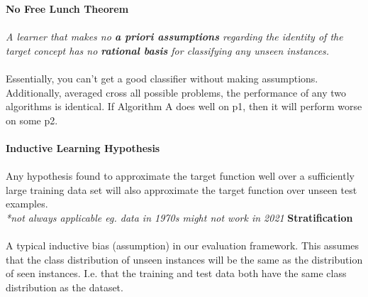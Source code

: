 \documentclass[a4paper,10pt]{article}
\begin{document}
\textcolor{Periwinkle}{\textbf{No Free Lunch Theorem}}\\\\
\textit{A learner that makes no \textbf{a priori assumptions} regarding the identity of the target concept has no \textbf{rational basis} for classifying any unseen instances.} \\\\
Essentially, you can't get a good classifier without making assumptions. \\
Additionally, averaged cross all possible problems, the performance of any two algorithms is identical. If Algorithm A does well on p1, then it will perform worse on some p2. \\\\
\textcolor{Periwinkle}{\textbf{Inductive Learning Hypothesis}}\\\\
Any hypothesis found to approximate the target function well over a sufficiently large training data set will also approximate the target function over unseen test examples. \\
\textit{*not always applicable eg. data in 1970s might not work in 2021}
\textcolor{Periwinkle}{\textbf{Stratification}}\\\\
A typical inductive bias (assumption) in our evaluation framework. This assumes that the class distribution of unseen instances will be the same as the distribution of seen instances. I.e. that the training and test data both have the same class distribution as the dataset. 
\newpage
\end{document}
